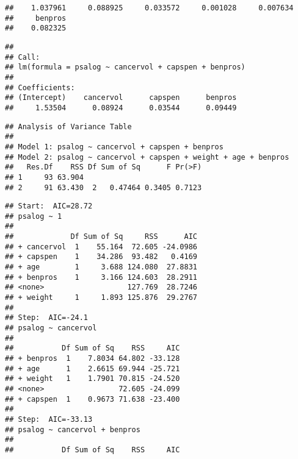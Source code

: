 \begin{knitrout}
\begin{kframe}
\begin{verbatim}
##    1.037961     0.088925     0.033572     0.001028     0.007634
##     benpros
##    0.082325
\end{verbatim}
\begin{alltt}
 \hlkwb{<-}  \hlopt{~}  \hlopt{+}  \hlopt{+} 
\end{alltt}
\begin{verbatim}
##
## Call:
## lm(formula = psalog ~ cancervol + capspen + benpros)
##
## Coefficients:
## (Intercept)    cancervol      capspen      benpros
##     1.53504      0.08924      0.03544      0.09449
\end{verbatim}
\begin{alltt}
\end{alltt}
\begin{verbatim}
## Analysis of Variance Table
##
## Model 1: psalog ~ cancervol + capspen + benpros
## Model 2: psalog ~ cancervol + capspen + weight + age + benpros
##   Res.Df    RSS Df Sum of Sq      F Pr(>F)
## 1     93 63.904
## 2     91 63.430  2   0.47464 0.3405 0.7123
\end{verbatim}
\begin{alltt}
 \hlkwb{<-}
    \hlstd{(} \hlopt{~} \hlstd{),}
     \hlstd{=} \hlstd{(} \hlstd{=} \hlopt{~}  \hlopt{+}  \hlopt{+}  \hlopt{+}  \hlopt{+} 
     \hlstd{=} \hlstd{)}
\end{alltt}
\begin{verbatim}
## Start:  AIC=28.72
## psalog ~ 1
##
##             Df Sum of Sq     RSS      AIC
## + cancervol  1    55.164  72.605 -24.0986
## + capspen    1    34.286  93.482   0.4169
## + age        1     3.688 124.080  27.8831
## + benpros    1     3.166 124.603  28.2911
## <none>                   127.769  28.7246
## + weight     1     1.893 125.876  29.2767
##
## Step:  AIC=-24.1
## psalog ~ cancervol
##
##           Df Sum of Sq    RSS     AIC
## + benpros  1    7.8034 64.802 -33.128
## + age      1    2.6615 69.944 -25.721
## + weight   1    1.7901 70.815 -24.520
## <none>                 72.605 -24.099
## + capspen  1    0.9673 71.638 -23.400
##
## Step:  AIC=-33.13
## psalog ~ cancervol + benpros
##
##           Df Sum of Sq    RSS     AIC

\end{verbatim}
\end{kframe}
\end{knitrout}
